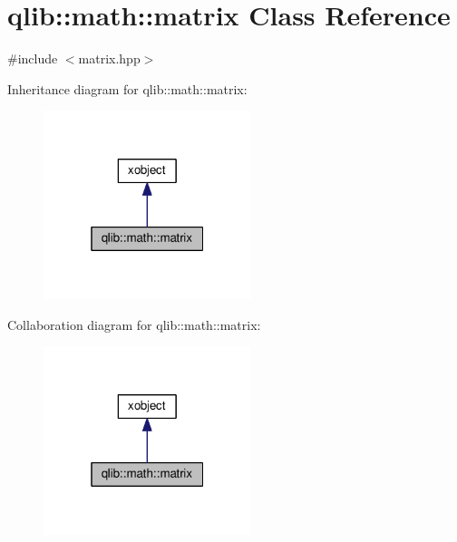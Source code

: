 \hypertarget{classqlib_1_1math_1_1matrix}{}\section{qlib\+:\+:math\+:\+:matrix Class Reference}
\label{classqlib_1_1math_1_1matrix}


{\ttfamily \#include $<$matrix.\+hpp$>$}



Inheritance diagram for qlib\+:\+:math\+:\+:matrix\+:\nopagebreak
\begin{figure}[H]
\begin{center}
\leavevmode
\includegraphics[width=172pt]{classqlib_1_1math_1_1matrix__inherit__graph}
\end{center}
\end{figure}


Collaboration diagram for qlib\+:\+:math\+:\+:matrix\+:\nopagebreak
\begin{figure}[H]
\begin{center}
\leavevmode
\includegraphics[width=172pt]{classqlib_1_1math_1_1matrix__coll__graph}
\end{center}
\end{figure}
